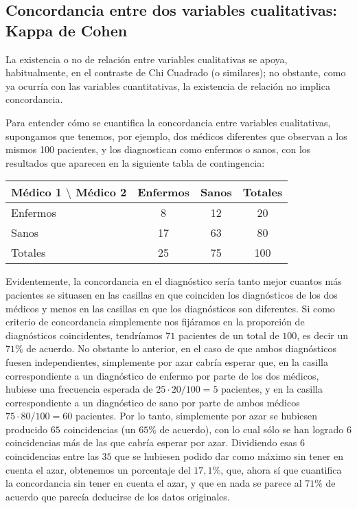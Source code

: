 \subsection{Concordancia entre dos variables cualitativas: Kappa de Cohen}
La existencia o no de relación entre variables cualitativas se apoya, habitualmente, en el contraste de Chi Cuadrado (o similares); no
obstante, como ya ocurría con las variables cuantitativas, la existencia de relación no implica concordancia.

Para entender cómo se cuantifica la concordancia entre variables cualitativas, supongamos que tenemos, por ejemplo, dos médicos diferentes
que observan a los mismos 100 pacientes, y los diagnostican como enfermos o sanos, con los resultados que aparecen en la siguiente tabla de
contingencia:

\begin{center}
\begin{tabular}{|l|c|c|c|}
\hline
Médico 1 $\setminus$ Médico 2 & Enfermos & Sanos & Totales \\
\hline
Enfermos & 8 & 12 & 20 \\
\hline
Sanos & 17 & 63 & 80 \\
\hline
Totales & 25 & 75 & 100 \\
\hline
\end{tabular}
\end{center}

Evidentemente, la concordancia en el diagnóstico sería tanto mejor cuantos más pacientes se situasen en las casillas en que coinciden los
diagnósticos de los dos médicos y menos en las casillas en que los diagnósticos son diferentes. Si como criterio de concordancia simplemente
nos fijáramos en la proporción de diagnósticos coincidentes, tendríamos $71$ pacientes de un total de $100$, es decir un $71\%$ de acuerdo.
No obstante lo anterior, en el caso de que ambos diagnósticos fuesen independientes, simplemente por azar cabría esperar que, en la casilla correspondiente a un diagnóstico de enfermo por parte de los 
dos médicos, hubiese una frecuencia esperada de $25\cdot 20/100=5$ pacientes, y en la casilla correspondiente a un diagnóstico de sano por
 parte de ambos médicos $75\cdot 80/100=60$ pacientes. Por lo tanto, simplemente por azar se hubiesen producido $65$ coincidencias (un $65\%$ de acuerdo), con lo cual sólo se han logrado $6$ coincidencias más de las que cabría esperar por azar. Dividiendo esas $6$ coincidencias entre
 las $35$ que se hubiesen podido dar como máximo sin tener en cuenta el azar, obtenemos un porcentaje del $17,1\%$, que, ahora sí que
 cuantifica la concordancia sin tener en cuenta el azar, y que en nada se parece al $71\%$ de acuerdo que parecía deducirse de los datos
 originales.

